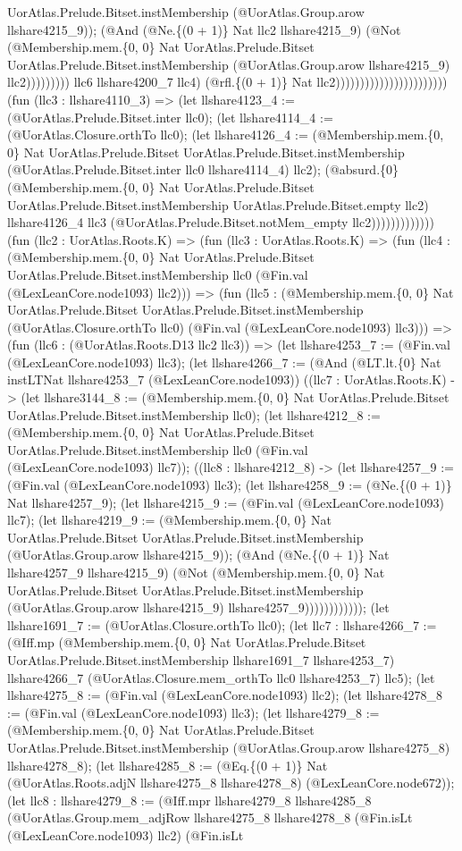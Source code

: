 \documentclass[11pt]{article}
\begin{document}
UorAtlas.Prelude.Bitset.instMembership (@UorAtlas.Group.arow llshare4215\_9)); (@And (@Ne.\{(0 + 1)\} Nat llc2 llshare4215\_9) (@Not (@Membership.mem.\{0, 0\} Nat UorAtlas.Prelude.Bitset UorAtlas.Prelude.Bitset.instMembership (@UorAtlas.Group.arow llshare4215\_9) llc2))))))))) llc6 llshare4200\_7 llc4) (@rfl.\{(0 + 1)\} Nat llc2))))))))))))))))))))))) (fun (llc3 : llshare4110\_3) => (let llshare4123\_4 := (@UorAtlas.Prelude.Bitset.inter llc0); (let llshare4114\_4 := (@UorAtlas.Closure.orthTo llc0); (let llshare4126\_4 := (@Membership.mem.\{0, 0\} Nat UorAtlas.Prelude.Bitset UorAtlas.Prelude.Bitset.instMembership (@UorAtlas.Prelude.Bitset.inter llc0 llshare4114\_4) llc2); (@absurd.\{0\} (@Membership.mem.\{0, 0\} Nat UorAtlas.Prelude.Bitset UorAtlas.Prelude.Bitset.instMembership UorAtlas.Prelude.Bitset.empty llc2) llshare4126\_4 llc3 (@UorAtlas.Prelude.Bitset.notMem\_empty llc2))))))))))))) (fun (llc2 : UorAtlas.Roots.K) => (fun (llc3 : UorAtlas.Roots.K) => (fun (llc4 : (@Membership.mem.\{0, 0\} Nat UorAtlas.Prelude.Bitset UorAtlas.Prelude.Bitset.instMembership llc0 (@Fin.val (@LexLeanCore.node1093) llc2))) => (fun (llc5 : (@Membership.mem.\{0, 0\} Nat UorAtlas.Prelude.Bitset UorAtlas.Prelude.Bitset.instMembership (@UorAtlas.Closure.orthTo llc0) (@Fin.val (@LexLeanCore.node1093) llc3))) => (fun (llc6 : (@UorAtlas.Roots.D13 llc2 llc3)) => (let llshare4253\_7 := (@Fin.val (@LexLeanCore.node1093) llc3); (let llshare4266\_7 := (@And (@LT.lt.\{0\} Nat instLTNat llshare4253\_7 (@LexLeanCore.node1093)) ((llc7 : UorAtlas.Roots.K) -> (let llshare3144\_8 := (@Membership.mem.\{0, 0\} Nat UorAtlas.Prelude.Bitset UorAtlas.Prelude.Bitset.instMembership llc0); (let llshare4212\_8 := (@Membership.mem.\{0, 0\} Nat UorAtlas.Prelude.Bitset UorAtlas.Prelude.Bitset.instMembership llc0 (@Fin.val (@LexLeanCore.node1093) llc7)); ((llc8 : llshare4212\_8) -> (let llshare4257\_9 := (@Fin.val (@LexLeanCore.node1093) llc3); (let llshare4258\_9 := (@Ne.\{(0 + 1)\} Nat llshare4257\_9); (let llshare4215\_9 := (@Fin.val (@LexLeanCore.node1093) llc7); (let llshare4219\_9 := (@Membership.mem.\{0, 0\} Nat UorAtlas.Prelude.Bitset UorAtlas.Prelude.Bitset.instMembership (@UorAtlas.Group.arow llshare4215\_9)); (@And (@Ne.\{(0 + 1)\} Nat llshare4257\_9 llshare4215\_9) (@Not (@Membership.mem.\{0, 0\} Nat UorAtlas.Prelude.Bitset UorAtlas.Prelude.Bitset.instMembership (@UorAtlas.Group.arow llshare4215\_9) llshare4257\_9)))))))))))); (let llshare1691\_7 := (@UorAtlas.Closure.orthTo llc0); (let llc7 : llshare4266\_7 := (@Iff.mp (@Membership.mem.\{0, 0\} Nat UorAtlas.Prelude.Bitset UorAtlas.Prelude.Bitset.instMembership llshare1691\_7 llshare4253\_7) llshare4266\_7 (@UorAtlas.Closure.mem\_orthTo llc0 llshare4253\_7) llc5); (let llshare4275\_8 := (@Fin.val (@LexLeanCore.node1093) llc2); (let llshare4278\_8 := (@Fin.val (@LexLeanCore.node1093) llc3); (let llshare4279\_8 := (@Membership.mem.\{0, 0\} Nat UorAtlas.Prelude.Bitset UorAtlas.Prelude.Bitset.instMembership (@UorAtlas.Group.arow llshare4275\_8) llshare4278\_8); (let llshare4285\_8 := (@Eq.\{(0 + 1)\} Nat (@UorAtlas.Roots.adjN llshare4275\_8 llshare4278\_8) (@LexLeanCore.node672)); (let llc8 : llshare4279\_8 := (@Iff.mpr llshare4279\_8 llshare4285\_8 (@UorAtlas.Group.mem\_adjRow llshare4275\_8 llshare4278\_8 (@Fin.isLt (@LexLeanCore.node1093) llc2) (@Fin.isLt 
\end{document}
